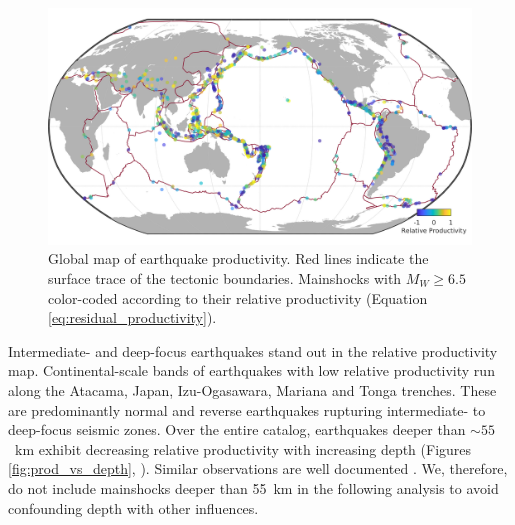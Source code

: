 \documentclass[draft, jgrga]{agujournal2018}
\begin{document}
    \begin{figure}
    \includegraphics[width = \linewidth]{figures/worldmap_res.png}
        \caption{Global map of earthquake productivity. Red lines indicate the surface trace of the tectonic boundaries. Mainshocks with $M_W\ge6.5$ color-coded according to their relative productivity (Equation \ref{eq:residual_productivity}).
        } 
        \label{fig:global_res}
    \end{figure}

    Intermediate- and deep-focus earthquakes stand out in the relative productivity map. Continental-scale bands of earthquakes with low relative productivity run along the Atacama, Japan, Izu-Ogasawara, Mariana and Tonga trenches. These are predominantly normal and reverse earthquakes rupturing intermediate- to deep-focus seismic zones. Over the entire catalog, earthquakes deeper than $\sim55$~km exhibit decreasing relative productivity with increasing depth (Figures \ref{fig:prod_vs_depth}, ). Similar observations are well documented \citep{Bath1965LateralMantle, Frohlich1989TheEarthquakes, Nyffenegger2000, Wiens1997AftershockZone, Wu1999, Houston2004}. We, therefore, do not include mainshocks deeper than 55~km  in the following analysis to avoid confounding depth with other influences.
    
\end{document}
